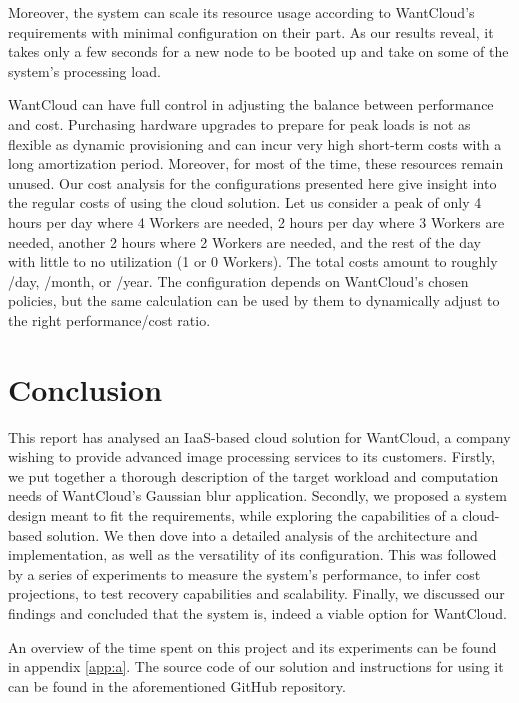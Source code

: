 \documentclass{acm_proc_article-sp}
\begin{document}
Moreover, the system can scale its resource usage according to WantCloud's requirements with minimal configuration on their part. 
As our results reveal, it takes only a few seconds for a new node to be booted up and take on some of the system's processing load. 

WantCloud can have full control in adjusting the balance between performance and cost. 
Purchasing hardware upgrades to prepare for peak loads is not as flexible as dynamic provisioning and can incur very high short-term costs with a long amortization period. 
Moreover, for most of the time, these resources remain unused. 
Our cost analysis for the configurations presented here give insight into the regular costs of using the cloud solution. 
Let us consider a peak of only 4 hours per day where 4 Workers are needed, 2 hours per day where 3 Workers are needed, another 2 hours where 2 Workers are needed, and the rest of the day with little to no utilization (1 or 0 Workers).
The total costs amount to roughly /day, /month, or /year.
The configuration depends on WantCloud's chosen policies, but the same calculation can be used by them to dynamically adjust to the right performance/cost ratio.


\section{Conclusion}
\label{sec:conclusion}
This report has analysed an IaaS-based cloud solution for WantCloud, a company wishing to provide advanced image processing services to its customers.
 Firstly, we put together a thorough description of the target workload and computation needs of WantCloud's Gaussian blur application. 
Secondly, we proposed a system design meant to fit the requirements, while exploring the capabilities of a cloud-based solution.
We then dove into a detailed analysis of the architecture and implementation, as well as the versatility of its configuration.
This was followed by a series of experiments to measure the system's performance, to infer cost projections, to test recovery capabilities and scalability.
Finally, we discussed our findings and concluded that the system is, indeed a viable option for WantCloud.

An overview of the time spent on this project and its experiments can be found in appendix \ref{app:a}.
The source code of our solution and instructions for using it can be found in the aforementioned GitHub repository\cite{web:git}.
\end{document}
